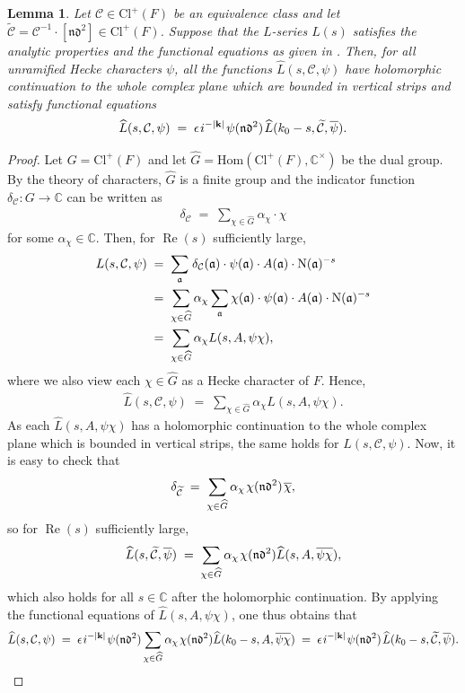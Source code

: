\documentclass[11pt]{amsart}
\newtheorem{lemma}[theorem]{Lemma}
\theoremstyle{remark}
\newcommand\mbf[1]{\mathbf{#1}}
\newcommand\cl[1]{\mathcal{#1}}
\newcommand\fr[1]{\mathfrak{#1}}
\newcommand\ov[1]{\overline{#1}}
\newcommand\wt[1]{\widetilde{#1}}
\newcommand\wh[1]{\widehat{#1}}
\newcommand{\comp}{\mathbb{C}}
\newcommand{\eq}{\;=\;}
\def\thin{{\hskip 1pt}}
\newcommand{\Hom}{\mathrm{Hom}}
\newcommand{\N}{\mathrm{N}}
\newcommand{\Cl}{\mathrm{Cl}}
\renewcommand{\Re}{\operatorname{Re}}
\begin{document}
\begin{lemma}
\label{partialfqn}
Let $\cl{C}\in\Cl^+(F)$ be an equivalence class and let $\wt{\cl{C}}=\cl{C}^{-1}\cdot[\fr{n}\fr{d}^2]\in\Cl^+(F)$. Suppose that the $L$-series $L(s)$ satisfies the analytic properties and the functional equations as given in . Then, for all unramified Hecke characters $\psi$, all the functions $\wh{L}(s,\cl{C},\psi)$ have holomorphic continuation to the whole complex plane which are bounded in vertical strips and satisfy functional equations
\begin{align*}
    \wh{L}(s,\cl{C},\psi)\eq \epsilon \thin i^{-|\mbf{k}|}\thin\psi(\fr{n}\fr{d}^2)\thin\wh{L}(k_0-s,\wt{\cl{C}},\ov{\psi}).
\end{align*}
\end{lemma}
\begin{proof}
Let $G=\Cl^+(F)$ and let $\wh{G}=\Hom(\Cl^+(F),\comp^\times)$ be the dual group. By the theory of characters, $\wh{G}$ is a finite group and the indicator function $\delta_\cl{C}:G\rightarrow\comp$ can be written as
\begin{align*}
    \delta_\cl{C}\eq\sum_{\chi\in\wh{G}}\alpha_\chi\cdot\chi
\end{align*}
for some $\alpha_\chi\in\comp$. Then, for $\Re(s)$ sufficiently large,
\begin{align*}
    L(s,\cl{C},\psi)&\eq\sum_{\fr{a}}\thin\delta_\cl{C}(\fr{a})\cdot\psi(\fr{a})\cdot A(\fr{a})\cdot\N(\fr{a})^{-s} \\
    &\eq \sum_{\chi\in\wh{G}}\alpha_\chi\sum_{\fr{a}}\chi(\fr{a})\cdot\psi(\fr{a})\cdot A(\fr{a})\cdot\N(\fr{a})^{-s} \\
    &\eq\sum_{\chi\in\wh{G}}\alpha_\chi L(s,A,\psi\chi),
\end{align*}
where we also view each $\chi\in\wh{G}$ as a Hecke character of $F$. Hence,
\begin{align*}
    \wh{L}(s,\cl{C},\psi)\eq\sum_{\chi\in\wh{G}}\alpha_\chi \wh{L}(s,A,\psi\chi).
\end{align*}
As each $\wh{L}(s,A,\psi\chi)$ has a holomorphic continuation to the whole complex plane which is bounded in vertical strips, the same holds for $\wh{L}(s,\cl{C},\psi)$. Now, it is easy to check that
\begin{align*}
    \delta_{\wt{\cl{C}}}\eq\sum_{\chi\in\wh{G}}\alpha_\chi\thin\chi(\fr{n}\fr{d}^2)\thin\ov{\chi},
\end{align*}
so for $\Re(s)$ sufficiently large,
\begin{align*}
    \wh{L}(s,\wt{\cl{C}},\ov{\psi})\eq\sum_{\chi\in\wh{G}}\alpha_\chi\thin\chi(\fr{n}\fr{d}^2)\wh{L}(s,A,\ov{\psi\chi}),
\end{align*}
which also holds for all $s\in\comp$ after the holomorphic continuation. By applying the functional equations of $\wh{L}(s,A,\psi\chi)$, one thus obtains that
\begin{align*}
    \wh{L}(s,\cl{C},\psi)\eq\epsilon\thin i^{-|\mbf{k}|}\thin\psi(\fr{n}\fr{d}^2)\sum_{\chi\in\wh{G}}\alpha_\chi\thin\chi(\fr{n}\fr{d}^2)\wh{L}(k_0-s,A,\ov{\psi\chi})\eq\epsilon\thin i^{-|\mbf{k}|}\thin\psi(\fr{n}\fr{d}^2)\thin\wh{L}(k_0-s,\wt{\cl{C}},\ov{\psi}).
\end{align*}
\end{proof}
\end{document}
